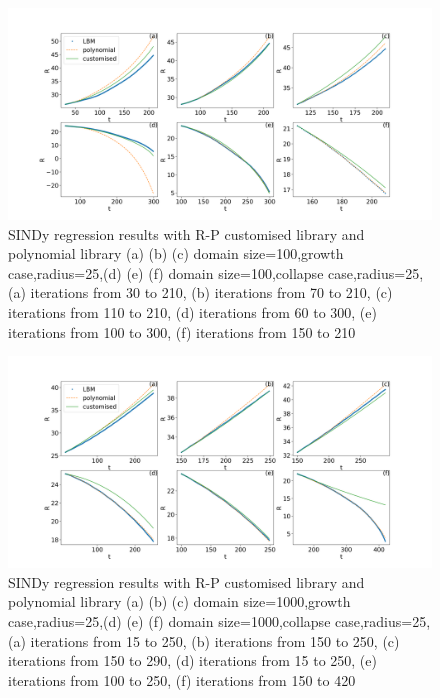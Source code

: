 \documentclass[review]{elsarticle}
\begin{document}
\begin{figure}[htp]
	\centering
	\includegraphics[scale=0.25]{SINDy-100}
	\caption{SINDy regression results with R-P customised library and polynomial library (a) (b) (c) domain size=100,growth case,radius=25,(d) (e) (f) domain size=100,collapse case,radius=25, (a) iterations from 30 to 210, (b) iterations from 70 to 210, (c) iterations from 110 to 210, (d) iterations from 60 to 300, (e) iterations from 100 to 300, (f) iterations from 150 to 210  }
	\label{fig:sindy-100}
\end{figure}
\begin{figure}[htp]
	\centering
	\includegraphics[scale=0.25]{SINDy-1000}
	\caption{SINDy regression results with R-P customised library and polynomial library (a) (b) (c) domain size=1000,growth case,radius=25,(d) (e) (f) domain size=1000,collapse case,radius=25, (a) iterations from 15 to 250, (b) iterations from 150 to 250, (c) iterations from 150 to 290, (d) iterations from 15 to 250, (e) iterations from 100 to 250, (f) iterations from 150 to 420 }
	\label{fig:sindy-1000}
\end{figure}
\end{document}
